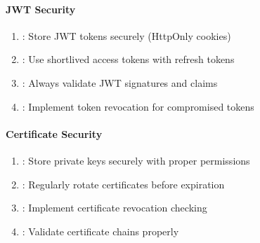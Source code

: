 \documentclass[letterpaper,10pt,english]{sphinxmanual}
\begin{document}
\paragraph{JWT Security}
\label{\detokenize{api/authentication:jwt-security}}\begin{enumerate}
%
\item {} 
\sphinxAtStartPar
{}: Store JWT tokens securely (HttpOnly cookies)

\item {} 
\sphinxAtStartPar
{}: Use short\sphinxhyphen{}lived access tokens with refresh tokens

\item {} 
\sphinxAtStartPar
{}: Always validate JWT signatures and claims

\item {} 
\sphinxAtStartPar
{}: Implement token revocation for compromised tokens

\end{enumerate}


\paragraph{Certificate Security}
\label{\detokenize{api/authentication:certificate-security}}\begin{enumerate}
%
\item {} 
\sphinxAtStartPar
{}: Store private keys securely with proper permissions

\item {} 
\sphinxAtStartPar
{}: Regularly rotate certificates before expiration

\item {} 
\sphinxAtStartPar
{}: Implement certificate revocation checking

\item {} 
\sphinxAtStartPar
{}: Validate certificate chains properly

\end{enumerate}
\end{document}
